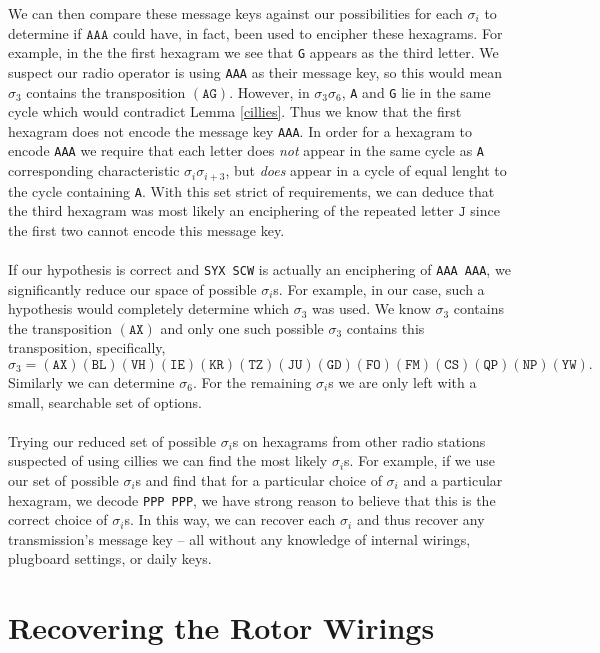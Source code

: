 \noindent We can then compare these message keys against our possibilities for each 
$\sigma_i$ to determine if $\texttt{AAA}$ could have, in fact, been
used to encipher these hexagrams. For example, in the the first hexagram we see that \texttt{G} appears as the third letter. We suspect our radio operator is using \texttt{AAA} as their message key, so this would mean $\sigma_3$ contains the transposition $(\texttt{AG})$. However, in $\sigma_3\sigma_6$, \texttt{A} and \texttt{G} lie in the
same cycle which would contradict Lemma
\ref{cillies}. Thus we know that the first hexagram does not encode the message key \texttt{AAA}. In order for a hexagram to encode \texttt{AAA} we require that each letter does \emph{not} appear in the same cycle as \texttt{A} corresponding characteristic $\sigma_i\sigma_{i+3}$, but \emph{does} appear in a cycle of equal lenght to the cycle containing \texttt{A}. With this set strict of requirements, we can deduce that the
third hexagram was most likely an enciphering of the repeated letter $\texttt{J}$ since the first two cannot encode this message key.
\\\\If our hypothesis is correct and \texttt{SYX SCW} is actually an enciphering of \texttt{AAA AAA}, we significantly reduce our space of possible $\sigma_i$s. For example, in our case, such a
hypothesis would completely determine which $\sigma_3$ was used. We know $\sigma_3$ contains the transposition $(\texttt{AX})$ and only one such possible $\sigma_3$ contains this transposition, specifically, 
\[
\sigma_3 = (\texttt{AX})(\texttt{BL})(\texttt{VH})(\texttt{IE})(\texttt{KR})(\texttt{TZ})(\texttt{JU})(\texttt{GD})(\texttt{FO})(\texttt{FM})(\texttt{CS})(\texttt{QP})(\texttt{NP})(\texttt{YW}).
\]Similarly we can determine $\sigma_6$.
For the remaining $\sigma_i$s we are only left
with a small, searchable set of options. 
\\\\Trying our reduced set of possible $\sigma_i$s on hexagrams from other radio stations
suspected of using cillies we can find the most likely $\sigma_i$s. For example, if we use our set of possible $\sigma_i$s and find that for a particular choice of $\sigma_i$ and a particular hexagram, we decode \texttt{PPP PPP}, we have strong reason to believe that this is the correct choice of $\sigma_i$s. 
In this way, we can recover each $\sigma_i$ and thus recover any
transmission's message key -- all without any knowledge of internal
wirings, plugboard settings, or daily keys.
\section{Recovering the Rotor Wirings}

